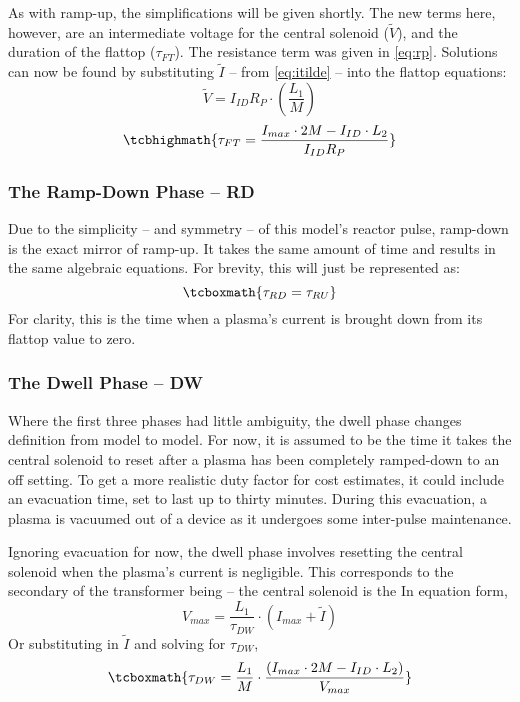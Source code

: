 As with ramp-up, the simplifications will be given shortly. The new terms here, however, are an intermediate voltage for the central solenoid ($\tilde V$), and the duration of the flattop ($\tau_{FT}$). The resistance term was given in \cref{eq:rp}. Solutions can now be found by substituting $\tilde I$ -- from \cref{eq:itilde} -- into the flattop equations:
\begin{equation}
	\tilde V = I_{ID} R_P \cdot \left( \frac{L_1}{M} \right)
\end{equation}
\begin{equation}
	\label{eq:tauft}
	\tcbhighmath{
	\tau_{FT} = \frac{ I_{max} \cdot 2 M - I_{ID} \cdot  L_2 }{I_{ID} R_P}
	}
\end{equation}

\subsubsection{The Ramp-Down Phase -- RD}

Due to the simplicity -- and symmetry -- of this model's reactor pulse, ramp-down is the exact mirror of ramp-up. It takes the same amount of time and results in the same algebraic equations. For brevity, this will just be represented as:
\begin{equation}
	\label{eq:taurd}
	\tcboxmath{
	\tau_{RD} = \tau_{RU}
	}
\end{equation}
For clarity, this is the time when a plasma's current is brought down from its flattop value to zero.

\subsubsection{The Dwell Phase -- DW}

Where the first three phases had little ambiguity, the dwell phase changes definition from model to model. For now, it is assumed to be the time it takes the central solenoid to reset after a plasma has been completely ramped-down to an off setting. To get a more realistic duty factor for cost estimates, it could include an evacuation time, set to last up to thirty minutes.\cite{hartmann} During this evacuation, a plasma is vacuumed out of a device as it undergoes some inter-pulse maintenance.

Ignoring evacuation for now, the dwell phase involves resetting the central solenoid when the plasma's current is negligible. This corresponds to the secondary of the transformer being  --  the central solenoid is the  In equation form,
\begin{equation}
	V_{max} = \frac{L_1}{\tau_{DW}} \cdot \left( I_{max} + \tilde I \right)
\end{equation}
Or substituting in $\tilde I$ and solving for $\tau_{DW}$,
\begin{equation}
	\label{eq:taudw}
	\tcboxmath{
	\tau_{DW} = \frac{L_1}{M} \cdot \frac{ \left( I_{max} \cdot 2 M - I_{ID} \cdot  L_2 \right) }{V_{max}}
	}
\end{equation}

